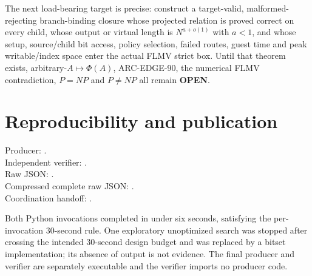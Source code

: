 \documentclass[11pt]{article}
\newcommand{\OPEN}{\textbf{OPEN}}
\begin{document}
The next load-bearing target is precise: construct a target-valid, malformed-
rejecting branch-binding closure whose projected relation is proved correct on
every child, whose output or virtual length is $N^{a+o(1)}$ with $a<1$, and
whose setup, source/child bit access, policy selection, failed routes, guest
time and peak writable/index space enter the actual FLMV strict box.  Until
that theorem exists, arbitrary-$A\mapsto\Phi(A)$, ARC-EDGE-90, the numerical
FLMV contradiction, $P=NP$ and $P\ne NP$ all remain \OPEN.

\section{Reproducibility and publication}

Producer:
.\\
Independent verifier:
.\\
Raw JSON:
.\\
Compressed complete raw JSON:
.\\
Coordination handoff:
.

Both Python invocations completed in under six seconds, satisfying the
per-invocation 30-second rule.  One exploratory unoptimized search was stopped
after crossing the intended 30-second design budget and was replaced by a
bitset implementation; its absence of output is not evidence.  The final
producer and verifier are separately executable and the verifier imports no
producer code.
\end{document}
